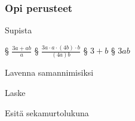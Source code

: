 \begin{tehtavasivu}

\subsubsection*{Opi perusteet}

\begin{tehtava} Supista 
\begin{vastaus}
\end{vastaus}
\end{tehtava}

§ $\frac{3a+ab}{a}$ 
§ $\frac{3a\cdot a\cdot(4b)\cdot b}{(4a)b}$
§ $3+b$
§ $3ab$

\begin{tehtava}
Lavenna samannimisiksi
\begin{vastaus}
\end{vastaus}
\end{tehtava}

\begin{tehtava}
Laske
	\begin{vastaus}
	\end{vastaus}
\end{tehtava}

\begin{tehtava}
Esitä sekamurtolukuna
\begin{vastaus}
\end{vastaus}
\end{tehtava}


\end{tehtavasivu}
